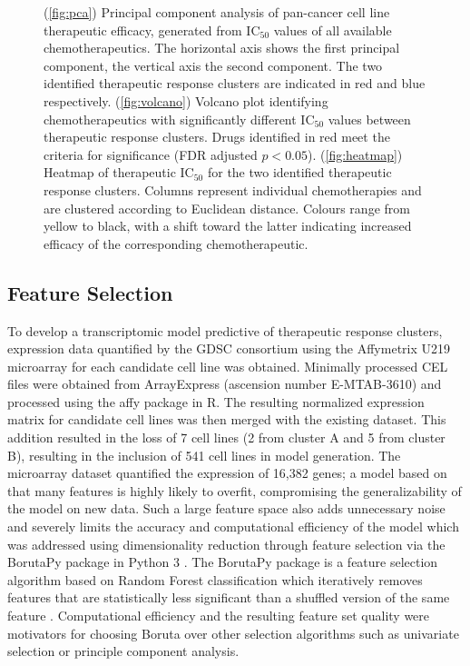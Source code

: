 \documentclass[10pt, letterpaper]{article}
\begin{document}
\begin{multicols*}{2}
\begin{figure}[!ht]
    \caption{(\ref{fig:pca}) Principal component analysis of pan-cancer cell line therapeutic efficacy, generated from IC$_{50}$ values of all available chemotherapeutics. The horizontal axis shows the first principal component, the vertical axis the second component. The two identified therapeutic response clusters are indicated in red and blue respectively. (\ref{fig:volcano}) Volcano plot identifying chemotherapeutics with significantly different IC$_{50}$ values between therapeutic response clusters. Drugs identified in red meet the criteria for significance (FDR adjusted $p<0.05$). (\ref{fig:heatmap}) Heatmap of therapeutic IC$_{50}$ for the two identified therapeutic response clusters. Columns represent individual chemotherapies and are clustered according to Euclidean distance. Colours range from yellow to black, with a shift toward the latter indicating increased efficacy of the corresponding chemotherapeutic.}
    \label{fig:clustering}
\end{figure}


\subsection*{Feature Selection}
To develop a transcriptomic model predictive of therapeutic response clusters, expression data quantified by the GDSC consortium using the Affymetrix U219 microarray for each candidate cell line was obtained. Minimally processed CEL files were obtained from ArrayExpress (ascension number E-MTAB-3610) and processed using the affy package in R. The resulting normalized expression matrix for candidate cell lines was then merged with the existing dataset. This addition resulted in the loss of 7 cell lines (2 from cluster A and 5 from cluster B), resulting in the inclusion of 541 cell lines in model generation. The microarray dataset quantified the expression of 16,382 genes; a model based on that many features is highly likely to overfit, compromising the generalizability of the model on new data. Such a large feature space also adds unnecessary noise and severely limits the accuracy and computational efficiency of the model which was addressed using dimensionality reduction through feature selection via the BorutaPy package in Python 3  \cite{liu}. The BorutaPy package is a feature selection algorithm based on Random Forest classification which iteratively removes features that are statistically less significant than a shuffled version of the same feature \cite{kursa}. Computational efficiency and the resulting feature set quality were motivators for choosing Boruta over other selection algorithms such as univariate selection or principle component analysis.



\end{multicols*}
\end{document}
